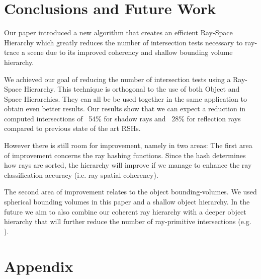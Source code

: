 \documentclass{egpubl}
\begin{document}

\section{Conclusions and Future Work}

Our paper introduced a new algorithm that creates an efficient Ray-Space Hierarchy which greatly reduces the number of intersection tests necessary to ray-trace a scene due to its improved coherency and shallow bounding volume hierarchy.

We achieved our goal of reducing the number of intersection tests using a Ray-Space Hierarchy. This technique is orthogonal to the use of both Object and Space Hierarchies. They can all be be used together in the same application to obtain even better results.
Our results show that we can expect a reduction in computed intersections of ~54\% for shadow rays and ~28\% for reflection rays compared to previous state of the art RSHs.

However there is still room for improvement, namely in two areas: The first area of improvement concerns the ray hashing functions. Since the hash determines how rays are sorted, the hierarchy will improve if we manage to enhance the ray classification accuracy (i.e. ray spatial coherency).

The second area of improvement relates to the object bounding-volumes. We used spherical bounding volumes in this paper and a shallow object hierarchy. In the future we aim to also combine our coherent ray hierarchy with a deeper object hierarchy that will further reduce the number of ray-primitive intersections (e.g. \cite{Bradshaw04}).






\nocite{*}

\vfill

\pagebreak 

\section*{Appendix}
\end{document}
